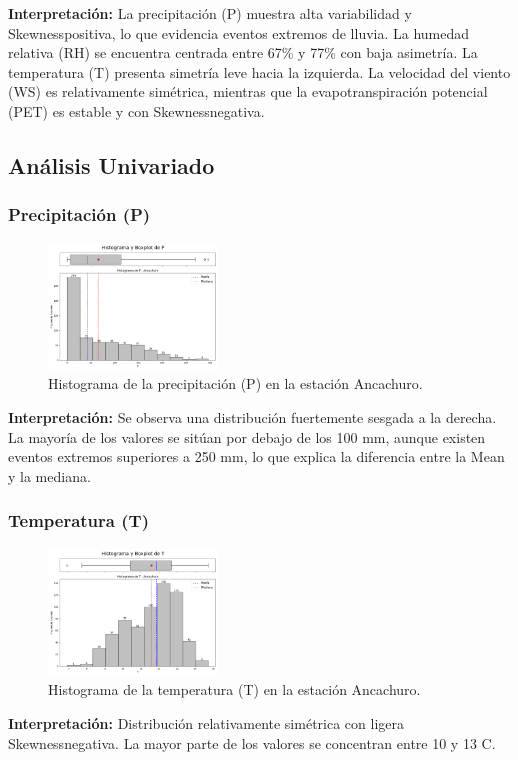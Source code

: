 \textbf{Interpretación:} La precipitación (P) muestra alta variabilidad y Skewnesspositiva, lo que evidencia eventos extremos de lluvia. La humedad relativa (RH) se encuentra centrada entre 67\% y 77\% con baja asimetría. La temperatura (T) presenta simetría leve hacia la izquierda. La velocidad del viento (WS) es relativamente simétrica, mientras que la evapotranspiración potencial (PET) es estable y con Skewnessnegativa.

\subsection{Análisis Univariado}

\subsubsection*{Precipitación (P)}
\begin{figure}[H]
\centering
\includegraphics[width=0.4\textwidth]{resultados/por_estacion_meteorologica/Ancachuro/P_histograma.png}
\caption{Histograma de la precipitación (P) en la estación Ancachuro.}
\label{fig:ancachuro_P}
\end{figure}
\textbf{Interpretación:} Se observa una distribución fuertemente sesgada a la derecha. La mayoría de los valores se sitúan por debajo de los 100 mm, aunque existen eventos extremos superiores a 250 mm, lo que explica la diferencia entre la Mean y la mediana.

\subsubsection*{Temperatura (T)}
\begin{figure}[H]
\centering
\includegraphics[width=0.4\textwidth]{resultados/por_estacion_meteorologica/Ancachuro/T_histograma.png}
\caption{Histograma de la temperatura (T) en la estación Ancachuro.}
\label{fig:ancachuro_T}
\end{figure}
\textbf{Interpretación:} Distribución relativamente simétrica con ligera Skewnessnegativa. La mayor parte de los valores se concentran entre 10 y 13 \textdegree C.

